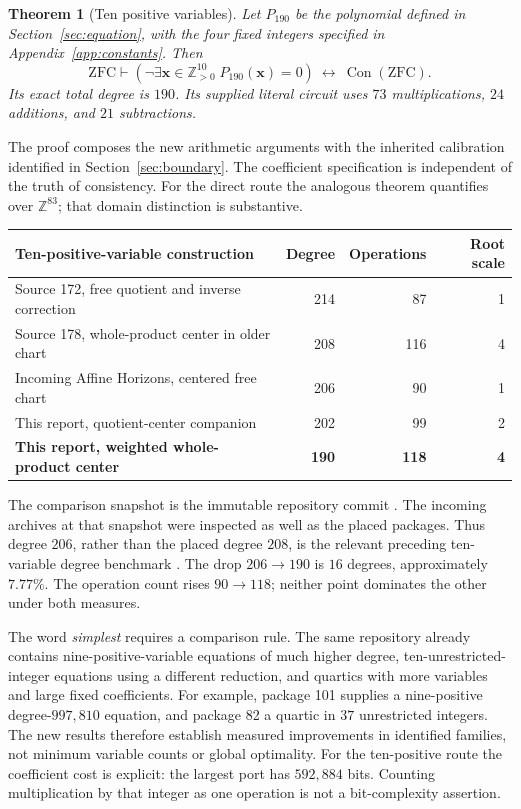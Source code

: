 \documentclass[11pt]{article}
\newtheorem{theorem}{Theorem}[section]
\theoremstyle{remark}
\newcommand{\Z}{\mathbb Z}
\newcommand{\Zpos}{\mathbb Z_{>0}}
\newcommand{\Con}{\operatorname{Con}}
\newcommand{\ZFC}{\mathrm{ZFC}}
\newcommand{\DirectVariables}{83}
\begin{document}
\begin{theorem}[Ten positive variables]\label{thm:principal}
Let \(P_{190}\) be the polynomial defined in Section~\ref{sec:equation},
with the four fixed integers specified in Appendix~\ref{app:constants}.
Then
\[
 \ZFC\vdash
 \left(\neg\exists\boldsymbol x\in\Zpos^{10}\;
                      P_{190}(\boldsymbol x)=0\right)
 \ \longleftrightarrow\ \Con(\ZFC).
\]
Its exact total degree is \(190\). Its supplied literal circuit uses
\(73\) multiplications, \(24\) additions, and \(21\) subtractions.
\end{theorem}

The proof composes the new arithmetic arguments with the inherited
calibration identified in Section~\ref{sec:boundary}.
The coefficient specification is independent of the truth of consistency.
For the direct route the analogous theorem quantifies over
\(\Z^{\DirectVariables}\); that domain distinction is substantive.

\begin{center}
\begin{tabular}{lrrr}
\toprule
Ten-positive-variable construction & Degree & Operations & Root scale\\
\midrule
Source 172, free quotient and inverse correction & 214 & 87 & 1\\
Source 178, whole-product center in older chart & 208 & 116 & 4\\
Incoming Affine Horizons, centered free chart & 206 & 90 & 1\\
This report, quotient-center companion & 202 & 99 & 2\\
\textbf{This report, weighted whole-product center} & \textbf{190} &
 \textbf{118} & \textbf{4}\\
\bottomrule
\end{tabular}
\end{center}

The comparison snapshot is the immutable repository commit
.
The incoming archives at that snapshot were inspected as well as the
placed packages. Thus degree \(206\), rather than the placed
degree \(208\), is the relevant preceding ten-variable degree benchmark
\cite{source172,source178,incomingAffine}.
The drop \(206\to190\) is \(16\) degrees, approximately \(7.77\%\).
The operation count rises \(90\to118\); neither point dominates the
other under both measures.

The word \emph{simplest} requires a comparison rule. The same repository
already contains nine-positive-variable equations of much higher degree,
ten-unrestricted-integer equations using a different reduction, and
quartics with more variables and large fixed coefficients.
For example, package 101 supplies a nine-positive degree-\(997{,}810\)
equation, and package 82 a quartic in \(37\) unrestricted integers.
The new results therefore establish measured improvements in identified
families, not minimum variable counts or global optimality.
For the ten-positive route the coefficient cost is explicit:
the largest port has \(592{,}884\) bits. Counting multiplication by that
integer as one operation is not a bit-complexity assertion.
\end{document}
